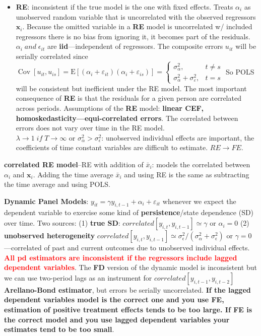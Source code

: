 \documentclass[
]{article}
\providecommand{\tightlist}{%
  \setlength{\itemsep}{0pt}\setlength{\parskip}{0pt}}
\begin{document}
\begin{itemize}
\tightlist
\item
  \textbf{RE}: inconsistent if the true model is the one with fixed
  effects. Treats \(\alpha_i\) as unobserved random variable that is
  uncorrelated with the observed regressors \(\mathbf{x}_{i}\). Because
  the omitted variable in a \textbf{RE} model is uncorrelated w/
  included regressors there is no bias from ignoring it, it becomes part
  of the residuals. \(\alpha_i \; and\; \epsilon_{it}\) are
  \textbf{iid}---independent of regressors. The composite errors
  \(u_{i t}\) will be serially correlated since
  \(\operatorname{Cov}\left[u_{i t}, u_{i s}\right]=\mathrm{E}\left[\left(\alpha_{i}+\varepsilon_{i t}\right)\left(\alpha_{i}+\varepsilon_{i s}\right)\right]=\left\{\begin{array}{ll} \sigma_{\alpha}^{2}, & t \neq s \\ \sigma_{\alpha}^{2}+\sigma_{\varepsilon}^{2}, & t=s \end{array}\right.\)
  So POLS will be consistent but inefficient under the RE model. The
  most important consequence of \textbf{RE} is that the residuals for a
  given person are correlated across periods. Assumptions of the
  \textbf{RE} model: \textbf{linear CEF,
  homoskedasticity---equi-correlated errors}. The correlated between
  errors does not vary over time in the RE model.\\
  \(\lambda \to 1 \;if\; T \to \infty\) or
  \(\sigma_\alpha^2 > \sigma_\epsilon^2\): unobserved individual effects
  are important, the coefficients of time constant variables are
  difficult to estimate. \(RE \to FE\).
\end{itemize}

\textbf{correlated RE model}--RE with addition of \(\bar{x}_i\): models
the correlated between \(\alpha_i\) and \(\boldsymbol{x}_{i}\). Adding
the time average \(\bar{x}_i\) and using RE is the same as subtracting
the time average and using POLS.

\textbf{Dynamic Panel Models}:
\(y_{i t}=\gamma y_{i, t-1}+\alpha_{i}+\varepsilon_{i t}\) whenever we
expect the dependent variable to exercise some kind of
\textbf{persistence}/state dependence (SD) over time. Two sources: (1)
\textbf{true SD}: \(correlated[y_{i, t}, y_{i, t-1}] \simeq \gamma\) or
\(\alpha_i = 0\) (2) \textbf{unobserved heterogeneity}
\(correlated[y_{i, t}, y_{i, t-1}] \simeq \sigma_\epsilon^2/(\sigma_\alpha^2 + \sigma_\epsilon^2)\)
or \(\gamma = 0\)---correlated of past and current outcomes due to
unobserved individual effects.
\textbf{\textcolor{red}{All pd estimators are inconsistent if the regressors include lagged dependent variables}}.
The \textbf{FD} version of the dynamic model is inconsistent but we can
use two-period lags as an instrument for
\(correlated[y_{i, t-1}, y_{i, t-2}]\) \textbf{Arellano-Bond estimator},
but errors be serially uncorrelated. \textbf{If the lagged dependent
variables model is the correct one and you use FE, estimation of
positive treatment effects tends to be too large. If FE is the correct
model and you use lagged dependent variables your estimates tend to be
too small}.
\end{document}
